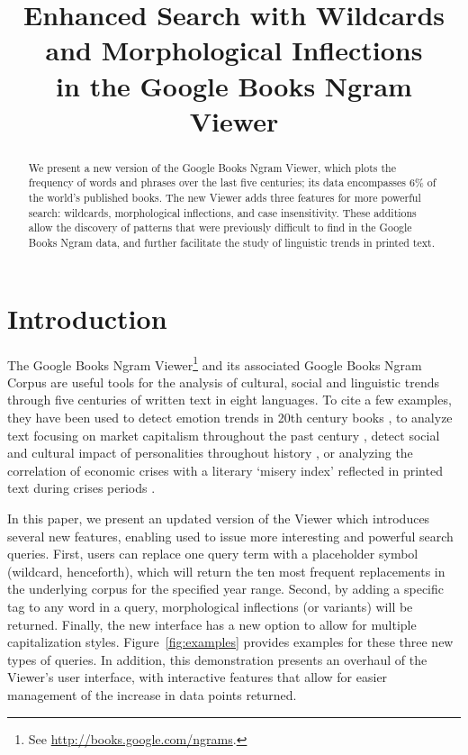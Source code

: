 \documentclass[11pt]{article}
\title{Enhanced Search with Wildcards and Morphological Inflections\\in the Google Books Ngram Viewer}
\date{}
\begin{document}
\maketitle

\begin{abstract}

We present a new version of the Google Books Ngram Viewer, which plots
the frequency of words and phrases over the last five
centuries; its data encompasses 6\% of the world's published books.
The new Viewer adds three features for more powerful search: wildcards,
morphological inflections, and case insensitivity. These additions allow
the discovery of patterns that were previously difficult to find in the Google Books Ngram data,
and further facilitate the study of linguistic trends in printed text.

\end{abstract}

\section{Introduction}

The Google Books Ngram Viewer\footnote{See \url{http://books.google.com/ngrams}.} and its associated Google Books Ngram Corpus \cite{lin2012syntactic} are useful tools for the analysis of cultural, social and linguistic trends through five centuries of written text in eight languages. To cite a few examples, they have been used to detect emotion trends in 20th century books \cite{acerbi.etal.2013}, to analyze text focusing on market capitalism throughout the past century \cite{Schulz2013}, detect social and cultural impact of personalities throughout history \cite{skiena.ward.2013}, or analyzing the correlation of economic crises with a literary `misery index' reflected in printed text during crises
periods \cite{bentley.et.al.2014}.

In this paper, we present an updated version of the Viewer which introduces several new features, enabling
used to issue more interesting and powerful search queries. First, users can replace one query term with a placeholder symbol (wildcard, henceforth), which will return the ten most frequent replacements in the underlying corpus for the specified year range. Second, by adding a specific tag to any word in a query, morphological inflections (or variants) will be returned. Finally, the new interface has a new option to allow for multiple capitalization styles. Figure~\ref{fig:examples} provides examples for these three new types of queries.
In addition, this demonstration presents an overhaul of the Viewer's user interface, with interactive features that allow for easier management of the increase in data points returned.
\end{document}
